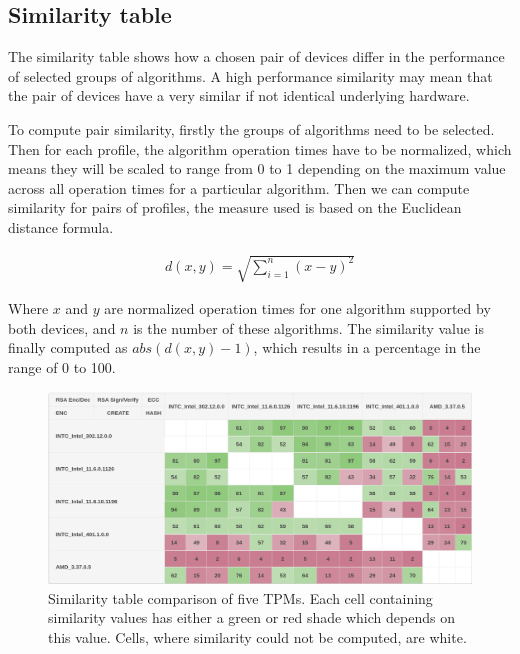 \subsection{Similarity table}
The similarity table shows how a chosen pair of devices differ in the performance of selected groups of algorithms. A high performance similarity may mean that the pair of devices have a very similar if not identical underlying hardware.

To compute pair similarity, firstly the groups of algorithms need to be selected. Then for each profile, the algorithm operation times have to be normalized, which means they will be scaled to range from 0 to 1 depending on the maximum value across all operation times for a particular algorithm. Then we can compute similarity for pairs of profiles, the measure used is based on the Euclidean distance formula.


\begin{align*}
    d(x, y) = \sqrt{\sum_{i=1}^{n}(x - y)^{2}} 
\end{align*}

Where $x$ and $y$ are normalized operation times for one algorithm supported by both devices, and $n$ is the number of these algorithms. The similarity value is finally computed as $abs(d(x, y) - 1)$, which results in a percentage in the range of 0 to 100.

\begin{figure}[!tbp]
    \centering
    \includegraphics[width=\textwidth]{img/visualizations/tpm-similarity-intext.png}
    \caption{Similarity table comparison of five TPMs. Each cell containing similarity values has either a green or red shade which depends on this value. Cells, where similarity could not be computed, are white.}
    \label{fig:simtable-intext}
\end{figure}




